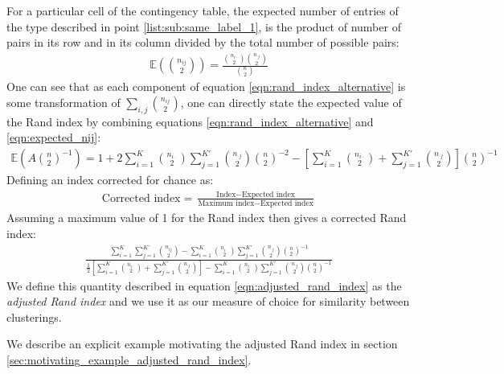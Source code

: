 \documentclass[12pt]{article} %
\begin{document}
For a particular cell of the contingency table, the expected number of entries of the type described in point \ref{list:sub:same_label_1}, is the product of number of pairs in its row and in its column divided by the total number of possible pairs:
\begin{eqnarray} \label{eqn:expected_nij}
\mathbb{E}\left(\binom{n_{ij}}{2}\right) = \frac{\binom{n_{i\cdot}}{2}\binom{n_{\cdot j}}{2}}{\binom{n}{2}}
\end{eqnarray}
One can see that as each component of equation \ref{eqn:rand_index_alternative} is some transformation of $\sum_{i,j}\binom{n_{ij}}{2}$, one can directly state the expected value of the Rand index by combining equations \ref{eqn:rand_index_alternative} and \ref{eqn:expected_nij}:
\begin{eqnarray}
\mathbb{E}\left(A \binom{n}{2}^{-1}\right) = 1 + 2 \sum_{i=1}^{K} \binom{n_{i \cdot}}{2} \sum_{j=1}^{K'} \binom{n_{\cdot j}}{2} \binom{n}{2}^{-2} - \left[\sum_{i=1}^{K} \binom{n_{i \cdot}}{2} + \sum_{j=1}^{K'} \binom{n_{\cdot j}}{2}\right] \binom{n}{2}^{-1}
\end{eqnarray}
Defining an index corrected for chance as:
\begin{eqnarray}
\text{Corrected index} = \frac{\text{Index} - \text{Expected index}}{\text{Maximum index} - \text{Expected index}}
\end{eqnarray}
Assuming a maximum value of 1 for the Rand index then gives a corrected Rand index:
\begin{eqnarray} \label{eqn:adjusted_rand_index}
\frac{\sum_{i=1}^{K}\sum_{j=1}^{K'} \binom{n_{ij}}{2} - \sum_{i=1}^{K} \binom{n_{i \cdot}}{2} \sum_{j=1}^{K'} \binom{n_{\cdot j}}{2} \binom{n}{2}^{-1}}{\frac{1}{2} \left[\sum_{i=1}^{K} \binom{n_{i \cdot}}{2} + \sum_{j=1}^{K'} \binom{n_{\cdot j}}{2}\right] - \sum_{i=1}^{K} \binom{n_{i \cdot}}{2} \sum_{j=1}^{K'} \binom{n_{\cdot j}}{2} \binom{n}{2}^{-1}}
\end{eqnarray}
We define this quantity described in equation \ref{eqn:adjusted_rand_index} as the \emph{adjusted Rand index} and we use it as our measure of choice for similarity between clusterings.

We describe an explicit example motivating the adjusted Rand index in section \ref{sec:motivating_example_adjusted_rand_index}.
\end{document}
